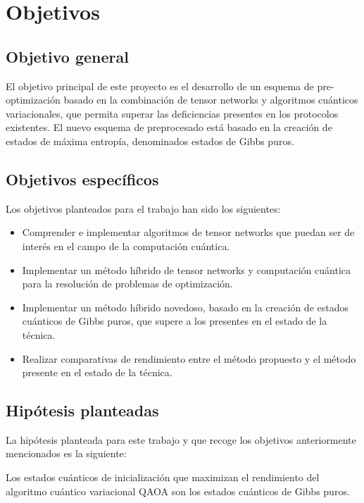 \chapter{Objetivos}
\label{chapter:goals}

\section{Objetivo general}

El objetivo principal de este proyecto es el desarrollo de un esquema de pre-optimización basado en la combinación de tensor networks y algoritmos cuánticos variacionales, que permita superar las deficiencias presentes en los protocolos existentes. El nuevo esquema de preprocesado está basado en la creación de estados de máxima entropía, denominados estados de Gibbs puros.

\section{Objetivos específicos}

Los objetivos planteados para el trabajo han sido los siguientes:

\begin{itemize}
    
    \item Comprender e implementar algoritmos de tensor networks que puedan ser de interés en el campo de la computación cuántica.
    
    \item Implementar un método híbrido de tensor networks y computación cuántica para la resolución de problemas de optimización.
   
    \item Implementar un método híbrido novedoso, basado en la creación de estados cuánticos de Gibbs puros, que supere a los presentes en el estado de la técnica.
     
    \item Realizar comparativas de rendimiento entre el método propuesto y el método presente en el estado de la técnica.

\end{itemize}

\section{Hipótesis planteadas}
\label{sub_sec:hip_work}

La hipótesis planteada para este trabajo y que recoge los objetivos anteriormente mencionados es la siguiente:\\

\begin{mdframed}[backgroundcolor=black!10]
\centering 

Los estados cuánticos de inicialización que maximizan el rendimiento del algoritmo cuántico variacional QAOA son los estados cuánticos de Gibbs puros. 

\end{mdframed}